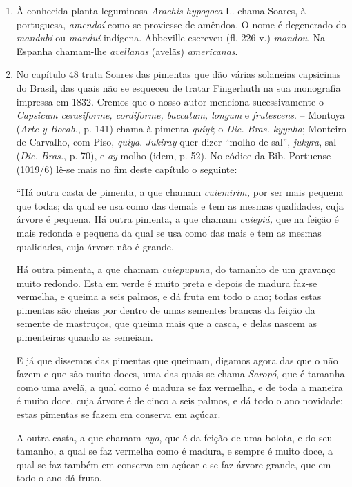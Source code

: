 \begin{enumerate}
\item À conhecida planta leguminosa \textit{Arachis hypogoea} L. chama Soares, à portuguesa,  
\textit{amendoí} como se proviesse de amêndoa. O nome é degenerado do \textit{mandubi} ou \textit{manduí}
indígena. Abbeville escreveu (fl. 226 v.) \textit{mandou}. Na  Espanha  chamam-lhe  
\textit{avellanas} (avelãs) \textit{americanas}.

\item No capítulo 48 trata Soares das pimentas que dão várias solaneias capsicinas do 
Brasil, das quais não se esqueceu de tratar Fingerhuth na sua monografia impressa em 
1832. Cremos que o nosso autor menciona sucessivamente o \textit{Capsicum cerasiforme, 
cordiforme, baccatum, longum} e \textit{frutescens}. -- Montoya (\textit{Arte y Bocab.}, p. 141) chama à 
pimenta \textit{quíyí}; o \textit{Dic. Bras. kyynha}; Monteiro de Carvalho, com Piso, \textit{quiya}.
\textit{Jukiray} quer dizer ``molho de sal'',  \textit{jukyra}, sal (\textit{Dic. Bras.}, p. 70), e \textit{ay} molho (idem, p. 52).
No códice da Bib. Portuense (1019/6) lê-se mais no fim deste capítulo o seguinte:

``Há outra casta de pimenta, a que chamam \textit{cuiemirim,} por ser mais pequena que todas; 
da qual se usa como das demais e tem as mesmas qualidades, cuja árvore é pequena.
Há outra pimenta, a que chamam \textit{cuiepiá,} que na feição é mais redonda e pequena da qual se 
usa como das mais e tem as mesmas qualidades, cuja árvore não é grande.

Há outra pimenta, a que chamam \textit{cuiepupuna}, do tamanho de um gravanço muito redondo. 
Esta em verde é muito preta e depois de madura faz-se vermelha, e queima a seis 
palmos, e dá fruta em todo o ano; todas estas pimentas são cheias por dentro de umas 
sementes brancas da feição da semente de mastruços, que queima mais que a casca, e delas 
nascem as pimenteiras quando as semeiam. 

E já que dissemos das pimentas que queimam, digamos agora das que o não fazem e 
que são muito doces, uma das quais se chama \textit{Saropó}, que é tamanha como uma avelã, a 
qual como é madura se faz vermelha, e de toda a maneira é muito doce, cuja árvore é de 
cinco a seis palmos, e dá todo o ano novidade; estas pimentas se fazem em conserva em 
açúcar. 

A outra casta, a que chamam \textit{ayo}, que é da feição de uma bolota, e do seu tamanho, a 
qual se faz vermelha como é madura, e sempre é muito doce, a qual se faz também em 
conserva em açúcar e se faz árvore grande, que em todo o ano dá fruto. 


\end{enumerate}
